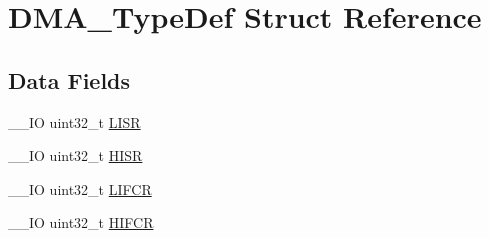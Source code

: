 \hypertarget{struct_d_m_a___type_def}{\section{D\-M\-A\-\_\-\-Type\-Def Struct Reference}
\label{struct_d_m_a___type_def}
}
\subsection*{Data Fields}
\begin{DoxyCompactItemize}
\item 
\-\_\-\-\_\-\-I\-O uint32\-\_\-t \hyperlink{struct_d_m_a___type_def_a5cdef358e9e95b570358e1f6a3a7f492}{L\-I\-S\-R}
\item 
\-\_\-\-\_\-\-I\-O uint32\-\_\-t \hyperlink{struct_d_m_a___type_def_a6fe40f7ac1a18c2726b328b5ec02b262}{H\-I\-S\-R}
\item 
\-\_\-\-\_\-\-I\-O uint32\-\_\-t \hyperlink{struct_d_m_a___type_def_ac4f7bf4cb172024bfc940c00167cd04e}{L\-I\-F\-C\-R}
\item 
\-\_\-\-\_\-\-I\-O uint32\-\_\-t \hyperlink{struct_d_m_a___type_def_ac55c27aeea4107813c1e7da3fcf46961}{H\-I\-F\-C\-R}
\end{DoxyCompactItemize}


